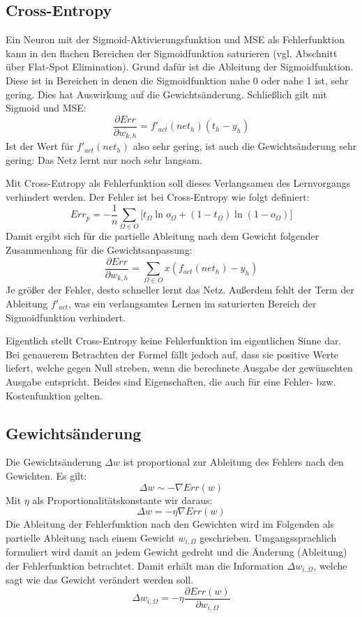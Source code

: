 \subsection*{Cross-Entropy}
Ein Neuron mit der Sigmoid-Aktivierungsfunktion und MSE als Fehlerfunktion kann in den flachen Bereichen der Sigmoidfunktion saturieren (vgl. Abschnitt über Flat-Spot Elimination).
Grund dafür ist die Ableitung der Sigmoidfunktion. Diese ist in Bereichen in denen die Sigmoidfunktion nahe 0 oder nahe 1 ist, sehr gering. Dies hat Auswirkung auf die Gewichtsänderung. Schließlich gilt mit Sigmoid und MSE:
\[
	\frac{\partial Err}{\partial w_{k,h}} = 
		f'_{act}(net_h) (t_h - y_h)
\]
Ist der Wert für $f'_{act}(net_h)$ also sehr gering, ist auch die Gewichtsänderung sehr gering: Das Netz lernt nur noch sehr langsam.

Mit Cross-Entropy als Fehlerfunktion soll dieses Verlangsamen des Lernvorgangs verhindert werden.
Der Fehler ist bei Cross-Entropy wie folgt definiert:
\[
	Err_p = -\frac{1}{n} \sum_{\Omega \in O} 
		\big[ t_{\Omega} \ln o_{\Omega} + (1-t_{\Omega} ) 
		\ln (1-o_{\Omega}) \big]
\]
Damit ergibt sich für die partielle Ableitung nach dem Gewicht folgender Zusammenhang für die Gewichtsanpassung:
\[
	\frac{\partial Err}{\partial w_{k,h}} = 
		\sum_{\Omega \in O} x ( f_{act}(net_h) - y_h )
\]
Je größer der Fehler, desto schneller lernt das Netz. Außerdem fehlt der Term der Ableitung $f'_{act}$, was ein verlangsamtes Lernen im saturierten Bereich der Sigmoidfunktion verhindert.

Eigentlich stellt Cross-Entropy keine Fehlerfunktion im eigentlichen Sinne dar. Bei genauerem Betrachten der Formel fällt jedoch auf, dass sie positive Werte liefert, welche gegen Null streben, wenn die berechnete Ausgabe der gewünschten Ausgabe entspricht. Beides sind Eigenschaften, die auch für eine Fehler- bzw. Kostenfunktion gelten.


\subsection*{Gewichtsänderung}
Die Gewichtsänderung $\Delta w$ ist proportional zur Ableitung des Fehlers nach den Gewichten. Es gilt:
\[
	\Delta w \sim - \nabla Err(w)
\]
Mit $\eta$ als Proportionalitätskonstante wir daraus:
\[
	\Delta w = - \eta \nabla Err(w)
\]
Die Ableitung der Fehlerfunktion nach den Gewichten wird im Folgenden als partielle Ableitung nach einem Gewicht $w_{i,\Omega}$ geschrieben. Umgangssprachlich formuliert wird damit an jedem Gewicht gedreht und die Änderung (Ableitung) der Fehlerfunktion betrachtet. Damit erhält man die Information $\Delta w_{i,\Omega}$, welche sagt wie das Gewicht verändert werden soll.
\[
	\Delta w_{i,\Omega} = - \eta \frac{\partial Err(w)}{\partial w_{i,\Omega}}
\]

